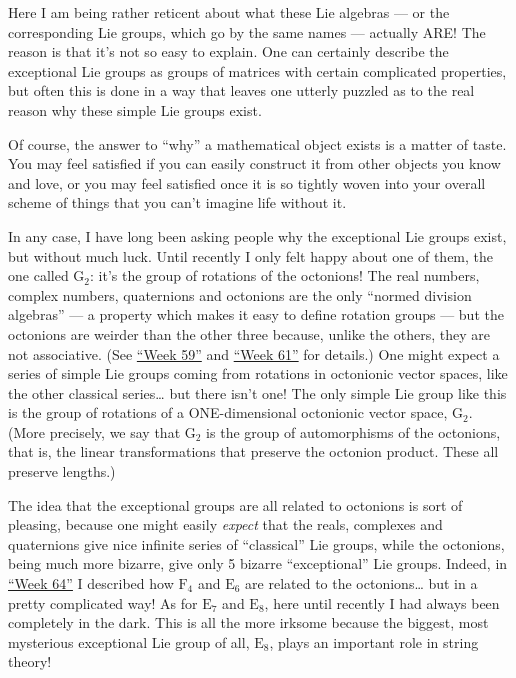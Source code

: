 \documentclass{article}
\begin{document}
Here I am being rather reticent about what these Lie algebras --- or the
corresponding Lie groups, which go by the same names --- actually ARE!
The reason is that it's not so easy to explain. One can certainly
describe the exceptional Lie groups as groups of matrices with certain
complicated properties, but often this is done in a way that leaves one
utterly puzzled as to the real reason why these simple Lie groups exist.

Of course, the answer to ``why'' a mathematical object exists is a
matter of taste. You may feel satisfied if you can easily construct it
from other objects you know and love, or you may feel satisfied once it
is so tightly woven into your overall scheme of things that you can't
imagine life without it.

In any case, I have long been asking people why the exceptional Lie
groups exist, but without much luck. Until recently I only felt happy
about one of them, the one called \(\mathrm{G}_2\): it's the group of
rotations of the octonions! The real numbers, complex numbers,
quaternions and octonions are the only ``normed division algebras'' ---
a property which makes it easy to define rotation groups --- but the
octonions are weirder than the other three because, unlike the others,
they are not associative. (See \protect\hyperlink{week59}{``Week 59''}
and \protect\hyperlink{week61}{``Week 61''} for details.) One might
expect a series of simple Lie groups coming from rotations in octonionic
vector spaces, like the other classical series\ldots{} but there isn't
one! The only simple Lie group like this is the group of rotations of a
ONE-dimensional octonionic vector space, \(\mathrm{G}_2\). (More
precisely, we say that \(\mathrm{G}_2\) is the group of automorphisms of
the octonions, that is, the linear transformations that preserve the
octonion product. These all preserve lengths.)

The idea that the exceptional groups are all related to octonions is
sort of pleasing, because one might easily \emph{expect} that the reals,
complexes and quaternions give nice infinite series of ``classical'' Lie
groups, while the octonions, being much more bizarre, give only 5
bizarre ``exceptional'' Lie groups. Indeed, in
\protect\hyperlink{week64}{``Week 64''} I described how \(\mathrm{F}_4\)
and \(\mathrm{E}_6\) are related to the octonions\ldots{} but in a
pretty complicated way! As for \(\mathrm{E}_7\) and \(\mathrm{E}_8\),
here until recently I had always been completely in the dark. This is
all the more irksome because the biggest, most mysterious exceptional
Lie group of all, \(\mathrm{E}_8\), plays an important role in string
theory!
\end{document}
